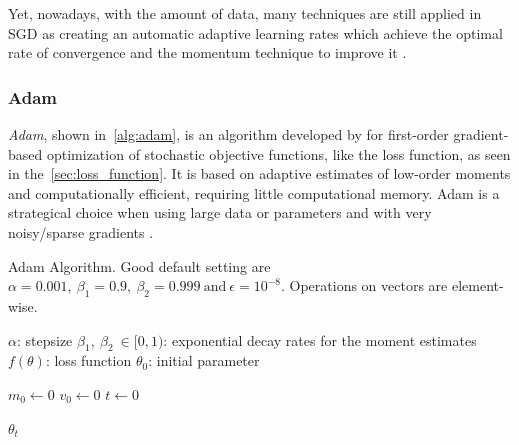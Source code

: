 Yet, nowadays, with the amount of data, many techniques are still applied in SGD as creating an automatic adaptive learning rates which achieve the optimal rate of convergence \cite{darken1991} and the momentum technique to improve it \cite{sutskever2013}.

\subsubsection*{Adam}

\emph{Adam}, shown in~\cref{alg:adam}, is an algorithm developed by \textcite{kingma2017} for first-order gradient-based optimization of stochastic objective functions, like the loss function, as seen in the~\cref{sec:loss_function}.
It is based on adaptive estimates of low-order moments and computationally efficient, requiring little computational memory.
Adam is a strategical choice when using large data or parameters and with very noisy/sparse gradients \cite{kingma2017}. 

\begin{algorithm}[!htb]
\caption[Adam Algorithm]{Adam Algorithm. Good default setting are \(\alpha = 0.001,\ \beta_1 = 0.9,\ \beta_2 = 0.999\ \text{and}\ \epsilon = 10^{-8}\). Operations on vectors are element-wise.}
\begin{algorithmic}\footnotesize
\Require \(\alpha\): stepsize
\Require \(\beta_1,\ \beta_2\ \in [0,1)\): exponential decay rates for the moment estimates
\Require \(f(\theta)\): loss function
\Require \(\theta_0\): initial parameter

\State \(m_0 \gets 0\)
\State \(v_0 \gets 0\)
\State \(t \gets 0\)
\EndWhile

\Return \(\theta_t\)
\end{algorithmic}
\label{alg:adam}
\end{algorithm}